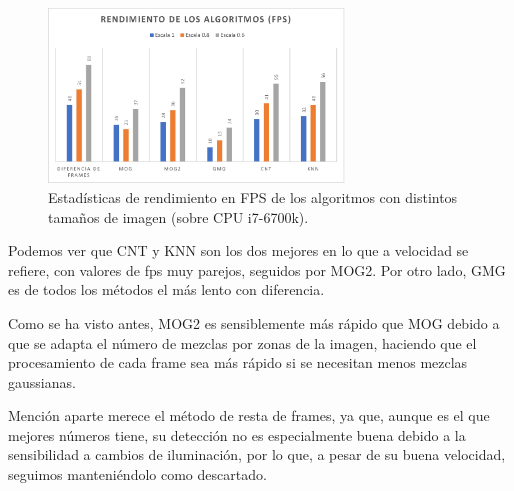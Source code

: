 
\begin{figure}
    \centering
    \includegraphics[width=0.7\textwidth]{images/plotFPS}
    \caption{Estadísticas de rendimiento en FPS de los algoritmos con distintos tamaños de imagen (sobre CPU i7-6700k).}
    \label{fig:fps}
\end{figure}


Podemos ver que CNT y KNN son los dos mejores en lo que a velocidad se refiere, con valores de fps muy parejos, seguidos por MOG2. Por otro lado, GMG es de todos los métodos el más lento con diferencia.

Como se ha visto antes, MOG2 es sensiblemente más rápido que MOG debido a que se adapta el número de mezclas por zonas de la imagen, haciendo que el procesamiento de cada frame sea más rápido si se necesitan menos mezclas gaussianas.

Mención aparte merece el método de resta de frames, ya que, aunque es el que mejores números tiene, su detección no es especialmente buena debido a la sensibilidad a cambios de iluminación, por lo que, a pesar de su buena velocidad, seguimos manteniéndolo como descartado.


